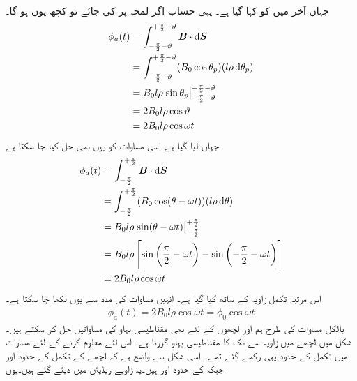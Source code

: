 جہاں آخر میں   کو  کہا گیا ہے۔ یہی حساب اگر لمحہ  پر کی جائے تو کچھ یوں ہو گا۔
\begin{gather}
\begin{aligned}
\phi_a(t)&=\int_{-\frac{\pi}{2}-\vartheta}^{+\frac{\pi}{2}-\vartheta} \kvec{B} \cdot \dif \kvec{S}\\
&=\int_{-\frac{\pi}{2}-\vartheta}^{+\frac{\pi}{2}-\vartheta} (B_0 \cos \theta_p)(l \rho \dif \theta_p)\\
&=B_0 l \rho \left. \sin \theta_p \right|_{-\frac{\pi}{2}-\vartheta}^{+\frac{\pi}{2}-\vartheta}\\
&=2 B_0 l \rho \cos \vartheta\\
&=2 B_0 l \rho \cos \omega t
\end{aligned}
\end{gather}
جہاں  لیا گیا ہے۔اسی مساوات کو یوں بھی حل کیا جا سکتا ہے
\begin{gather}
\begin{aligned}\label{مساوات_گھومتے_مشین_قطبی_بہاو_بالمقابل_وقت}
\phi_a(t)&=\int_{-\frac{\pi}{2}}^{+\frac{\pi}{2}} \kvec{B} \cdot \dif \kvec{S}\\
&=\int_{-\frac{\pi}{2}}^{+\frac{\pi}{2}} (B_0 \cos (\theta-\omega t))(l \rho \dif \theta)\\
&=B_0 l \rho \left. \sin (\theta-\omega t) \right|_{-\frac{\pi}{2}}^{+\frac{\pi}{2}}\\
&=B_0 l \rho \left[\sin \left(\frac{\pi}{2}-\omega t \right )-\sin \left (-\frac{\pi}{2}-\omega t \right) \right]\\
&=2 B_0 l \rho \cos \omega t
\end{aligned}
\end{gather}
اس مرتبہ تکمل زاویہ  کے ساتھ کیا گیا ہے۔ انہیں مساوات   کی مدد سے یوں لکھا جا سکتا ہے۔
\begin{align}
\phi_a(t)=2 B_0 l \rho \cos \omega t=\phi_0 \cos \omega t
\end{align}
بالکل مساوات   کی طرح ہم   اور  لچھوں کے لئے  بھی مقناطیسی بہاو کی مساواتیں حل کر سکتے ہیں۔شکل   میں  لچھے میں زاویہ  سے   تک کا مقناطیسی بہاو گزرتا ہے۔ اس لئے   معلوم کرنے کے لئے مساوات   میں تکمل کے حدود یہی رکھے گئے تھے۔ اسی شکل سے واضح ہے کہ  لچھے کے تکمل کے حدود 
  اور  جبکہ  کے حدود  اور  ہیں۔یہ زاویے ریڈیئن میں دیئے گئے ہیں۔یوں
